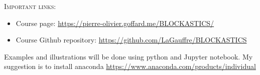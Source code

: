 \documentclass[11pt]{article}
\def\courseWebpage{\href{https://pierre-olivier.goffard.me/BLOCKASTICS/}{https://pierre-olivier.goffard.me/BLOCKASTICS/}}
\def\courseGithubRepo{\href{https://github.com/LaGauffre/BLOCKASTICS}{https://github.com/LaGauffre/BLOCKASTICS}}
\begin{document}


\textsc{Important links:}
\begin{itemize}  
\item Course page: \courseWebpage  
\item Course Github repository: \courseGithubRepo
\end{itemize}
\noindent Examples and illustrations will be done using python and Jupyter notebook. My suggestion is to install anaconda \url{https://www.anaconda.com/products/individual} 

\nocite{*}



\end{document}
